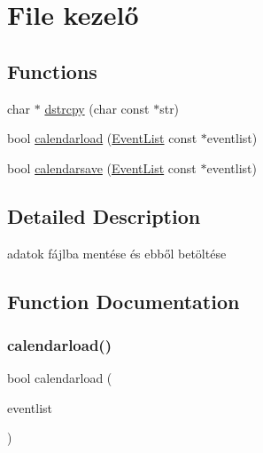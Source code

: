 \hypertarget{group__file}{}\section{File kezelő}
\label{group__file}
\subsection*{Functions}
\begin{DoxyCompactItemize}
\item 
char $\ast$ \hyperlink{group__file_ga91b52505951ff88321e947b6e1c4b779}{dstrcpy} (char const $\ast$str)
\item 
bool \hyperlink{group__file_gaf4efa1e078c7552b2f70daf3a40039c7}{calendarload} (\hyperlink{struct_event_list}{Event\+List} const $\ast$eventlist)
\item 
bool \hyperlink{group__file_ga7f69872489b7c1c4bcdd125319a87b2e}{calendarsave} (\hyperlink{struct_event_list}{Event\+List} const $\ast$eventlist)
\end{DoxyCompactItemize}


\subsection{Detailed Description}
adatok fájlba mentése és ebből betöltése 

\subsection{Function Documentation}
\mbox{\label{group__file_gaf4efa1e078c7552b2f70daf3a40039c7}} 
\subsubsection{\texorpdfstring{calendarload()}{calendarload()}}
{\footnotesize\ttfamily bool calendarload (\begin{DoxyParamCaption}\item[{\hyperlink{struct_event_list}{Event\+List} const $\ast$}]{eventlist }\end{DoxyParamCaption})}

